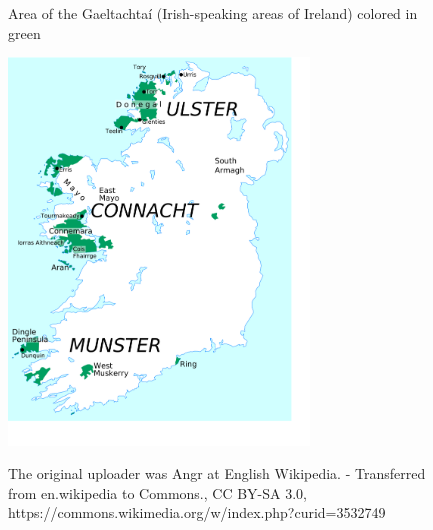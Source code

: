 \documentclass[thesis]{cluu}
\begin{document}
\begin{figure}[h]
    \caption{Area of the Gaeltachtaí (Irish-speaking areas of Ireland) colored in green}
    \includegraphics[width=8cm]{Gaeltachtai_le_hainmneacha2.png}
    \centering
    \label{fig:gaeltacht}
    \caption{The original uploader was Angr at English Wikipedia. - Transferred from en.wikipedia to Commons., CC BY-SA 3.0, https://commons.wikimedia.org/w/index.php?curid=3532749}
\end{figure} 
\end{document}
